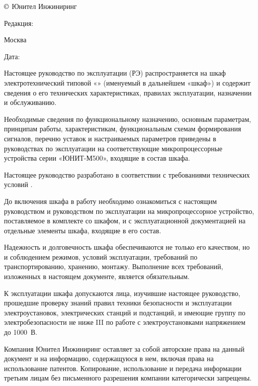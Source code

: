 \pagestyle{plain}

\pagecolor{white}

\noindent
$\copyright$ \the\year{} Юнител Инжиниринг
\hfill
\parbox{0.3\textwidth}{\raggedleft Редакция: \textcolor{unigray}{\rev}}

\vspace{3mm}
\noindent
Москва
\hfill
\parbox{0.3\textwidth}{\raggedleft Дата: \textcolor{unigray}{\revdate}}
\vspace{8mm}

Настоящее руководство по эксплуатации (РЭ) распространяется на шкаф электротехнический типовой «\devicetype» (именуемый в дальнейшем «шкаф») и содержит сведения о его технических характеристиках, правилах эксплуатации, назначении и обслуживанию.

Необходимые сведения по функциональному назначению, основным параметрам, принципам работы, характеристикам, функциональным схемам формирования сигналов, перечню уставок и настраиваемых параметров приведены в руководствах по эксплуатации на соответствующие микропроцессорные устройства серии «ЮНИТ-М500», входящие в состав шкафа.

Настоящее руководство разработано в соответствии с требованиями технических условий \ManualTechSpec.

До включения шкафа в работу необходимо ознакомиться с настоящим руководством и руководством по эксплуатации на микропроцессорное устройство, поставляемое в комплекте со шкафом, и с эксплуатационной документацией на отдельные элементы шкафа, входящие в его состав.

Надежность и долговечность шкафа обеспечиваются не только его качеством, но и соблюдением режимов, условий эксплуатации, требований по транспортированию, хранению, монтажу. Выполнение всех требований, изложенных в настоящем документе, является обязательным.

К эксплуатации шкафа допускаются лица, изучившие настоящее руководство, прошедшие проверку знаний правил техники безопасности и эксплуатации электроустановок, электрических станций и подстанций, и имеющие группу по электробезопасности не ниже III по работе с электроустановками напряжением до 1000~В.

\vspace{35mm}
Компания Юнител Инжиниринг оставляет за собой авторские права на данный документ и на информацию, содержащуюся в нем, включая права на использование патентов. Копирование, использование и передача информации третьим лицам без письменного разрешения компании категорически запрещены.

